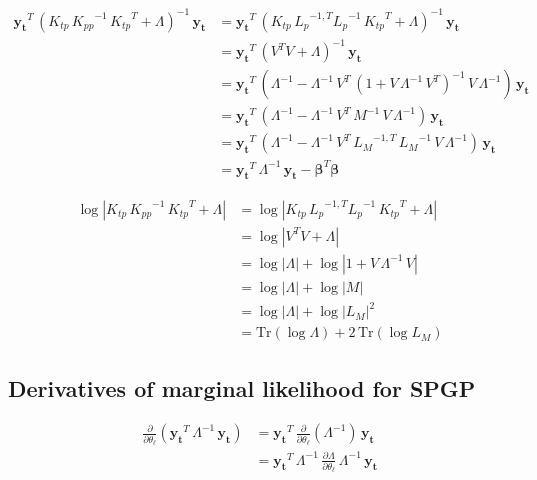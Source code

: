 \documentclass[11pt,a4paper]{article}
\newcommand{\abs}[1]{\left| #1 \right|}
\newcommand{\tr}{\text{Tr}}
\numberwithin{equation}{section}
\begin{document}
\begin{align}
\mathbf{y_t}^T\,(K_{tp}\,{K_{pp}}^{-1}\,{K_{tp}}^T + \Lambda)^{-1}\,\mathbf{y_t}
 &= \mathbf{y_t}^T\,(K_{tp}\,{L_p}^{-1,T}{L_p}^{-1}\,{K_{tp}}^T + \Lambda)^{-1}\,\mathbf{y_t} \\
 &= \mathbf{y_t}^T\,(V^T V + \Lambda)^{-1}\,\mathbf{y_t} \\
 &= \mathbf{y_t}^T\,(\Lambda^{-1} - \Lambda^{-1}\,V^T\,(1 + V\,\Lambda^{-1}\,V^T)^{-1}\,V\,\Lambda^{-1})\,\mathbf{y_t} \\
 &= \mathbf{y_t}^T\,(\Lambda^{-1} - \Lambda^{-1}\,V^T\,M^{-1}\,V\,\Lambda^{-1})\,\mathbf{y_t} \\
 &= \mathbf{y_t}^T\,(\Lambda^{-1} - \Lambda^{-1}\,V^T\,{L_M}^{-1,T}\,{L_M}^{-1}\,V\,\Lambda^{-1})\,\mathbf{y_t} \\
 &= \mathbf{y_t}^T\,\Lambda^{-1}\,\mathbf{y_t} - {\bm \beta}^T{\bm \beta}
\end{align}

\begin{align}
\log \abs{K_{tp}\,{K_{pp}}^{-1}\,{K_{tp}}^T + \Lambda}
 &= \log \abs{K_{tp}\,{L_p}^{-1,T}{L_p}^{-1}\,{K_{tp}}^T + \Lambda} \\
 &= \log \abs{V^T V + \Lambda} \\
 &= \log \abs{\Lambda} + \log \abs{1 + V\,\Lambda^{-1}\,V} \\
 &= \log \abs{\Lambda} + \log \abs{M} \\
 &= \log \abs{\Lambda} + \log \abs{L_M}^2 \\
 &= \tr \left(\log \Lambda \right) + 2\,\tr \left(\log L_M \right)
\end{align}

\subsection{Derivatives of marginal likelihood for SPGP \label{APP:detail_mlik_der_spgp}}

\begin{align}
\frac{\partial}{\partial \theta_\ell}\left(\mathbf{y_t}^T\,\Lambda^{-1}\,\mathbf{y_t}\right)
  &= \mathbf{y_t}^T\,\frac{\partial}{\partial \theta_\ell}\left(\Lambda^{-1}\right)\,\mathbf{y_t} \\
  &= \mathbf{y_t}^T\,\Lambda^{-1}\,\frac{\partial \Lambda}{\partial \theta_\ell}\,\Lambda^{-1}\,\mathbf{y_t}
\end{align}
\end{document}
